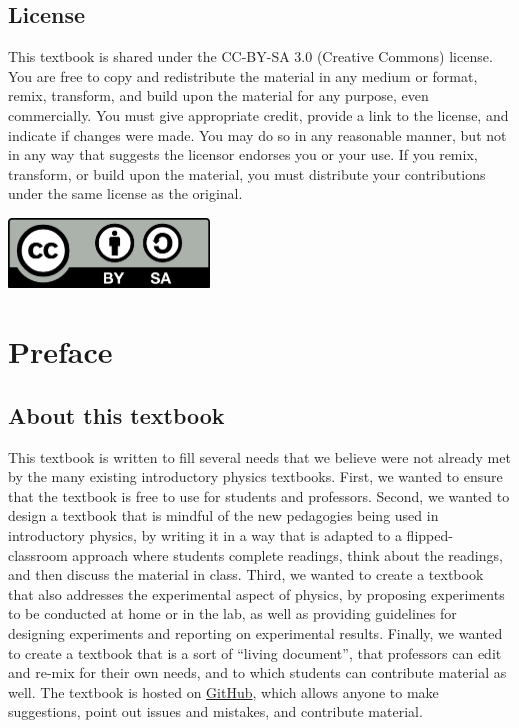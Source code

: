 \section*{License}
This textbook is shared under the CC-BY-SA 3.0 (Creative Commons) license. You are free to copy and redistribute the material in any medium or format, remix, transform, and build upon the material for any purpose, even commercially. You must give appropriate credit, provide a link to the license, and indicate if changes were made. You may do so in any reasonable manner, but not in any way that suggests the licensor endorses you or your use. If you remix, transform, or build upon the material, you must distribute your contributions under the same license as the original.
\vspace{\fill}
\begin{center}
\includegraphics[width=0.4\textwidth]{figures/Preface/license.png}
\end{center}
\newpage

\chapter*{Preface}
\label{chap:ipreface}
\section*{About this textbook}
This textbook is written to fill several needs that we believe were not already met by the many existing introductory physics textbooks. First, we wanted to ensure that the textbook is free to use for students and professors. Second, we wanted to design a textbook that is mindful of the new pedagogies being used in introductory physics, by writing it in a way that is adapted to a flipped-classroom approach where students complete readings, think about the readings, and then discuss the material in class. Third, we wanted to create a textbook that also addresses the experimental aspect of physics, by proposing experiments to be conducted at home or in the lab, as well as providing guidelines for designing experiments and reporting on experimental results. Finally, we wanted to create a textbook that is a sort of ``living document'', that professors can edit and re-mix for their own needs, and to which students can contribute material as well. The textbook is hosted on \href{https://github.com/OSTP/PhysicsArtofModelling}{GitHub}, which allows anyone to make suggestions, point out issues and mistakes, and contribute material.

